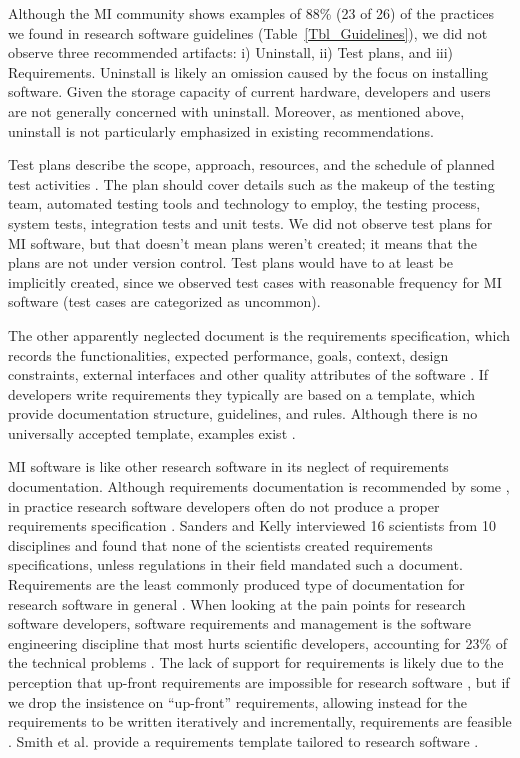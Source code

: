 \documentclass[11pt]{article}
\begin{document}
Although the MI community shows examples of 88\% (23 of 26) of the practices we
found in research software guidelines (Table~\ref{Tbl_Guidelines}), we did not
observe three recommended artifacts: i) Uninstall, ii) Test plans, and iii)
Requirements.  Uninstall is likely an omission caused by the focus on installing
software. Given the storage capacity of current hardware, developers and users
are not generally concerned with uninstall.  Moreover, as mentioned above,
uninstall is not particularly emphasized in existing recommendations.  

Test plans describe the scope, approach, resources, and the schedule of planned
test activities \cite{VanVliet2000}.  The plan should cover details such as the
makeup of the testing team, automated testing tools and technology to employ,
the testing process, system tests, integration tests and unit tests. We did not
observe test plans for MI software, but that doesn't mean plans weren't created;
it means that the plans are not under version control. Test plans would have to
at least be implicitly created, since we observed test cases with reasonable
frequency for MI software (test cases are categorized as uncommon).

The other apparently neglected document is the requirements specification, which
records the functionalities, expected performance, goals, context, design
constraints, external interfaces and other quality attributes of the software
\cite{IEEE1998}.  If developers write requirements they typically are based on a
template, which provide documentation structure, guidelines, and rules.
Although there is no universally accepted template, examples exist
\cite{ESA1991, IEEE1998, NASA1989, RobertsonAndRobertson1999Vol}.

MI software is like other research software in its neglect of requirements
documentation.  Although requirements documentation is recommended by some
\cite{TobiasEtAl2018, HerouxEtAl2008, SmithAndKoothoor2016}, in practice
research software developers often do not produce a proper requirements
specification \cite{HeatonAndCarver2015}. Sanders and Kelly
\cite{SandersAndKelly2008} interviewed 16 scientists from 10 disciplines and
found that none of the scientists created requirements specifications, unless
regulations in their field mandated such a document.  Requirements are the least
commonly produced type of documentation for research software in general
\cite{Nguyen-HoanEtAl2010}. When looking at the pain points for research
software developers, software requirements and management is the software
engineering discipline that most hurts scientific developers, accounting for
23\% of the technical problems \cite{WieseEtAl2019}.  The lack of support for
requirements is likely due to the perception that up-front requirements are
impossible for research software \cite{CarverEtAl2007, SegalAndMorris2008}, but
if we drop the insistence on ``up-front'' requirements, allowing instead for the
requirements to be written iteratively and incrementally, requirements are
feasible \cite{Smith2016}.  Smith et al. provide a requirements template
tailored to research software \cite{SmithEtAl2007}. 
\end{document}
